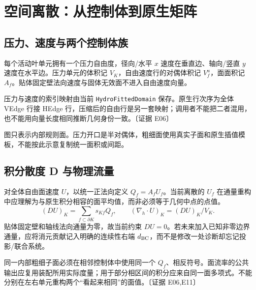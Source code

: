 \documentclass[UTF8,a4paper,11pt,fontset=fandol]{ctexart}
\newcommand{\code}[1]{\nolinkurl{#1}}
\newcommand{\ev}[1]{{\small\color{muted}〔证据 #1〕}}
\begin{document}
\section{空间离散：从控制体到原生矩阵}
\subsection{压力、速度与两个控制体族}
每个活动叶单元拥有一个压力自由度，径向/水平 $x$ 速度在垂直边、轴向/竖直 $y$ 速度在水平边。压力单元的体积记 $V_K$，自由速度行的对偶体积记 $V_f^u$，面面积记 $A_f$。贴体固定壁法向速度与固体无效面不进入自由速度向量。

压力与速度的索引映射由当前 \code{HydroFittedDomain} 保存。原生行次序为全体 VEdge 行接 HEdge 行，压缩后的自由行是另一套映射；调用者不能把二者混用，也不能用向量长度相同推断几何身份一致。\ev{E06}

\begin{center}
\end{center}
图只表示内部规则面。压力开口是半对偶体，粗细面使用真实子面和原生插值模板，不能按此示意复制统一面积或间距。

\subsection{积分散度 D 与物理流量}
对全体自由面速度 $U$，以统一正法向定义 $Q_f=A_fU_f$。当前离散的 $U_f$ 在通量重构中应理解为与原生积分相容的面平均值，而非必须等于几何中点的点值。
\begin{equation}
 (DU)_K=\sum_{f\subset\partial K}s_{Kf}Q_f,
 \qquad (\nabla_h\cdot U)_K=(DU)_K/V_K.
 \label{eq:divergence}
\end{equation}
贴体固定壁和轴线法向通量为零，故当前约束 $DU=0$。若未来加入已知非零边界通量，应将消元贡献记入明确的连续性右端 $d_{\rm BC}$，而不是修改一处诊断却忘记投影/联合系统。

同一内部粗细子面必须在相邻控制体中使用同一个 $Q_f$、相反符号。面流率的公共输出应复用装配所用实际度量；用于部分相区间的积分应来自同一面多项式。不能分别在左右单元重构两个“看起来相同”的面值。\ev{E06,E11}
\end{document}

